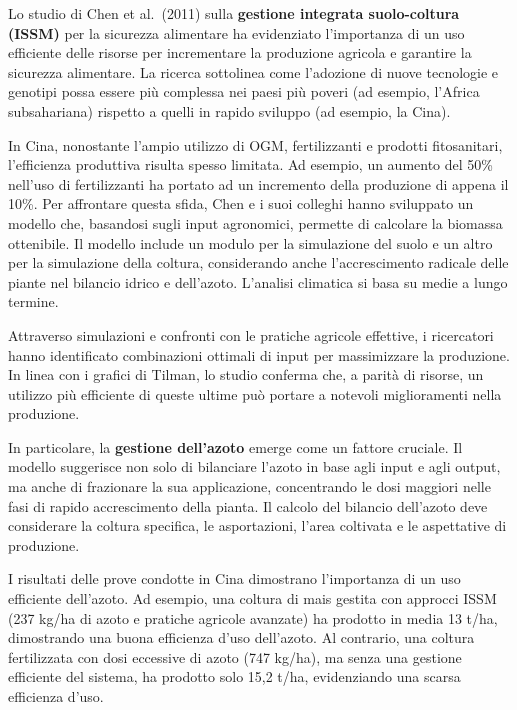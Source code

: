 \documentclass[
]{book}
\begin{document}
Lo studio di Chen et al.~(2011) sulla \textbf{gestione integrata
suolo-coltura (ISSM)} per la sicurezza alimentare ha evidenziato
l'importanza di un uso efficiente delle risorse per incrementare la
produzione agricola e garantire la sicurezza alimentare. La ricerca
sottolinea come l'adozione di nuove tecnologie e genotipi possa essere
più complessa nei paesi più poveri (ad esempio, l'Africa subsahariana)
rispetto a quelli in rapido sviluppo (ad esempio, la Cina).

In Cina, nonostante l'ampio utilizzo di OGM, fertilizzanti e prodotti
fitosanitari, l'efficienza produttiva risulta spesso limitata. Ad
esempio, un aumento del 50\% nell'uso di fertilizzanti ha portato ad un
incremento della produzione di appena il 10\%. Per affrontare questa
sfida, Chen e i suoi colleghi hanno sviluppato un modello che, basandosi
sugli input agronomici, permette di calcolare la biomassa ottenibile. Il
modello include un modulo per la simulazione del suolo e un altro per la
simulazione della coltura, considerando anche l'accrescimento radicale
delle piante nel bilancio idrico e dell'azoto. L'analisi climatica si
basa su medie a lungo termine.

Attraverso simulazioni e confronti con le pratiche agricole effettive, i
ricercatori hanno identificato combinazioni ottimali di input per
massimizzare la produzione. In linea con i grafici di Tilman, lo studio
conferma che, a parità di risorse, un utilizzo più efficiente di queste
ultime può portare a notevoli miglioramenti nella produzione.

In particolare, la \textbf{gestione dell'azoto} emerge come un fattore
cruciale. Il modello suggerisce non solo di bilanciare l'azoto in base
agli input e agli output, ma anche di frazionare la sua applicazione,
concentrando le dosi maggiori nelle fasi di rapido accrescimento della
pianta. Il calcolo del bilancio dell'azoto deve considerare la coltura
specifica, le asportazioni, l'area coltivata e le aspettative di
produzione.

I risultati delle prove condotte in Cina dimostrano l'importanza di un
uso efficiente dell'azoto. Ad esempio, una coltura di mais gestita con
approcci ISSM (237 kg/ha di azoto e pratiche agricole avanzate) ha
prodotto in media 13 t/ha, dimostrando una buona efficienza d'uso
dell'azoto. Al contrario, una coltura fertilizzata con dosi eccessive di
azoto (747 kg/ha), ma senza una gestione efficiente del sistema, ha
prodotto solo 15,2 t/ha, evidenziando una scarsa efficienza d'uso.
\end{document}
